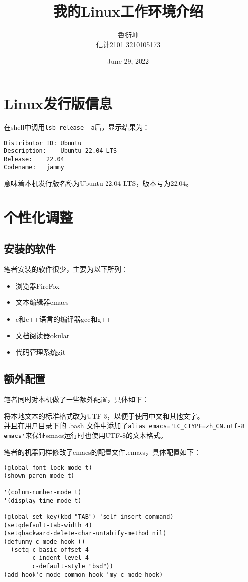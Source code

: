 \documentclass[UTF8]{article}
\title{我的Linux工作环境介绍}
\author{鲁衍坤 \\ 信计2101 3210105173}
\date{June 29, 2022}
\begin{document}
\maketitle

\section{Linux发行版信息}

在shell中调用\verb|lsb_release -a|后，显示结果为：\cite{ct1}

\begin{verbatim}
Distributor ID:	Ubuntu
Description:	Ubuntu 22.04 LTS
Release:	22.04
Codename:	jammy
\end{verbatim}

意味着本机发行版名称为Ubuntu 22.04 LTS，版本号为22.04。

\section{个性化调整}

\subsection{安装的软件}

笔者安装的软件很少，主要为以下所列：

\begin{itemize}
\item 浏览器FireFox
\item 文本编辑器emacs
\item c和c++语言的编译器gcc和g++
\item 文档阅读器okular
\item 代码管理系统git
\end{itemize}

\subsection{额外配置}

笔者同时对本机做了一些额外配置，具体如下：

将本地文本的标准格式改为UTF-8，以便于使用中文和其他文字。\\
并且在用户目录下的 .bash 文件中添加了\verb|alias emacs='LC_CTYPE=zh_CN.utf-8 emacs'|来保证emacs运行时也使用UTF-8的文本格式。

笔者的机器同样修改了emacs的配置文件.emacs，具体配置如下：

\begin{verbatim}
(global-font-lock-mode t)
(shown-paren-mode t)

'(colum-number-mode t)
'(display-time-mode t)

(global-set-key(kbd "TAB") 'self-insert-command)
(setqdefault-tab-width 4)
(setqbackward-delete-char-untabify-method nil)
(defunmy-c-mode-hook ()
  (setq c-basic-offset 4
        c-indent-level 4
        c-default-style "bsd"))
(add-hook'c-mode-common-hook 'my-c-mode-hook)
\end{verbatim}
\end{document}
